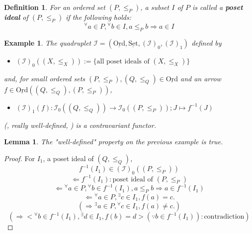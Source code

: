 \documentclass[dvipdfmx,10pt,notheorems]{beamer}
\newtheorem{definition}[theorem]{Definition}
\newtheorem{example}[theorem]{Example}
\newtheorem{lemma}[theorem]{Lemma}
\renewcommand{\#}{^\sharp}
\begin{document}
	\begin{frame}
			\begin{definition}
					For an ordered set $(P,\leq_P)$, a subset $I$ of $P$ is called a {\bf poset ideal} of $(P,\leq_P)$ if the following holds:
					$${}^\forall a\in P, {}^\forall b\in I, a\leq_P b \Rightarrow a\in I$$
			\end{definition}
			\begin{example}
					The quadruplet
					$\mathcal{I}=(\underline{\mathrm{Ord}},
					\underline{\mathrm{Set}},
					(\mathcal{I})_0,(\mathcal{I})_1)$ defined by
							\begin{itemize}
									\item $(\mathcal{I})_0((X,\leq_X)):=\{\mbox{all poset ideals of }(X,\leq_X)\}$
							\end{itemize}
					and, for small ordered sets $(P,\leq_P),(Q,\leq_Q)\in\underline{\mathrm{Ord}}$ and an arrow
					$f\in\underline{\mathrm{Ord}}((Q,\leq_Q),(P,\leq_P))$,
							\begin{itemize}
									\item $(\mathcal{I})_1(f):\mathcal{I}_0((Q,\leq_Q))\rightarrow\mathcal{I}_0((P,\leq_P));
									J\mapsto f^{-1}(J)
									$
							\end{itemize}
					(, really well-defined, ) is a contravariant functor.
			\end{example}
	\end{frame}



	\begin{frame}
			\begin{lemma}
					The "well-defined" property on the previous example is true.
			\end{lemma}
			\begin{proof}
					For $I_1$, a poset ideal of $(Q,\leq_Q)$,
					$$f^{-1}(I_1)\in(\mathcal{I})_0((P,\leq_P))$$
					$$\Leftarrow f^{-1}(I_1):\mbox{poset ideal of }(P,\leq_P)$$
					$$\Leftarrow{}^\forall a\in P, {}^\forall b\in f^{-1}(I_1), a\leq _P b\Rightarrow a\in f^{-1}(I_1)$$
					$$\Leftarrow {}^\forall a\in P,{}^\exists c\in I_1, f(a)=c.$$
					$$(\Rightarrow {}^\exists a\in P,{}^\forall c\in I_1, f(a)\neq c.)$$
					$$(\Rightarrow <{}^\forall b\in f^{-1}(I_1),
					{}^\exists d\in I_1, f(b)=d> (\because b\in f^{-1}(I_1)):\mbox{contradiction})$$
			\end{proof}
	\end{frame}
\end{document}
